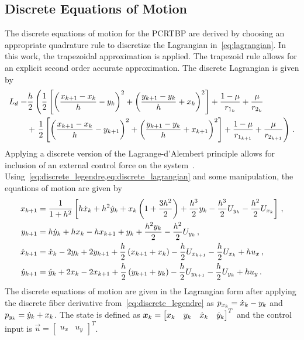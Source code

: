 \documentclass[preprint]{elsarticle}
\begin{document}
\subsection{Discrete Equations of Motion}
The discrete equations of motion for the PCRTBP are derived by choosing an appropriate quadrature rule to discretize the Lagrangian in~\cref{eq:lagrangian}. 
In this work, the trapezoidal approximation is applied.
The trapezoid rule allows for an explicit second order accurate approximation.
The discrete Lagrangian is given by
\begin{align}\label{eq:discrete_lagrangian}
	L_d = &\frac{h}{2} \left( \frac{1}{2} \left[ \left(  \frac{x_{k+1} - x_k}{h} -y_{k} \right)^2 + \left( \frac{y_{k+1} - y_{k}}{h} + x_k \right)^2 \right] + \frac{1 - \mu}{r_{1_k}} + \frac{\mu}{r_{2_k}} \right. \nonumber \\ 
		& + \left. \frac{1}{2} \left[ \left(  \frac{x_{k+1} - x_k}{h} -y_{k+1} \right)^2 + \left( \frac{y_{k+1} - y_{k}}{h} + x_{k+1} \right)^2 \right] + \frac{1-\mu}{r_{1_{k+1}}} + \frac{\mu}{r_{2_{k+1}}}  \right) \, .
\end{align}
Applying a discrete version of the Lagrange-d'Alembert principle allows for inclusion of an external control force on the system~\cite{marsden2001}.
Using~\cref{eq:discrete_legendre,eq:discrete_lagrangian} and some manipulation, the equations of motion are given by
\begin{subequations}\label{eq:discrete_eoms}
\begin{align}
	x_{k+1} &= \frac{1}{1+ h^2} \left[ h \dot{x}_k + h^2 \dot{y}_k  + x_k \left( 1+ \frac{3h^2}{2} \right) + \frac{h^3}{2} y_{k} - \frac{h^3}{2} U_{y_k} - \frac{h^2}{2} U_{x_k}  \right] \label{eq:xkp} \, ,\\
	y_{k+1} &= h \dot{y}_k + h x_k - h x_{k+1} + y_{k} + \frac{h^2 y_{k}}{2} - \frac{h^2 }{2} U_{y_k} \label{eq:ykp} \, ,\\
	\dot{x}_{k+1} &= \dot{x}_k - 2 y_{k} + 2 y_{k+1} + \frac{h}{2} \left( x_{k+1} + x_k \right) - \frac{h}{2} U_{x_{k+1}} - \frac{h}{2} U_{x_k} + h u_x \label{eq:xdotkp}\, ,\\
	\dot{y}_{k+1} &= \dot{y}_{k} + 2 x_k - 2 x_{k+1} + \frac{h}{2} \left( y_{k+1} + y_{k} \right) - \frac{h}{2} U_{y_{k+1}} - \frac{h}{2} U_{y_{k}} + h u_y \label{eq:ydotkp} \, .
\end{align}
\end{subequations}
The discrete equations of motion are given in the Lagrangian form after applying the discrete fiber derivative from~\cref{eq:discrete_legendre} as \( p_{x_k} = \dot{x}_k - y_{k} \) and \( p_{y_{k}} = \dot{y}_k + x_k \).
The state is defined as \( \boldsymbol{x}_k = \begin{bmatrix} x_k & y_{k} & \dot{x}_k & \dot{y}_k \end{bmatrix}^T\) and the control input is \( \vec{u} = \begin{bmatrix} u_x & u_y \end{bmatrix}^T \).
\end{document}
